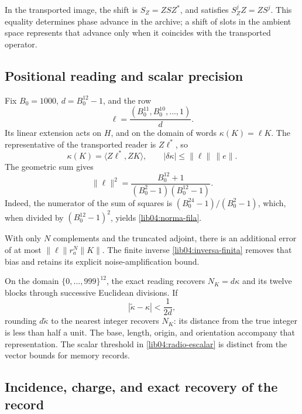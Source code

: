 In the transported image, the shift is
\(S_Z=ZSZ^*\), and satisfies \(S_Z^jZ=ZS^j\). This equality
determines phase advance in the archive; a shift of slots in the
ambient space represents that advance only when it coincides with
the transported operator.

\subsection{Positional reading and scalar precision}
\label{lib04:kappa}

Fix \(B_0=1000\), \(d=B_0^{12}-1\), and the row
\begin{equation}
 \ell=\frac{(B_0^{11},B_0^{10},\ldots,1)}{d}.
 \label{lib04:fila-posicional}
\end{equation}
Its linear extension acts on \(H\), and on the domain of words
\(\kappa(K)=\ell K\). The representative of the transported reader is
\(Z\ell^*\), so
\begin{equation}
 \kappa(K)=\langle Z\ell^*,ZK\rangle,\qquad
 |\delta\kappa|\leq\|\ell\|\,\|e\|.
 \label{lib04:lectura-kappa}
\end{equation}
The geometric sum gives
\begin{equation}
 \|\ell\|^2
 =\frac{B_0^{12}+1}{(B_0^2-1)(B_0^{12}-1)}.
 \label{lib04:norma-fila}
\end{equation}
Indeed, the numerator of the sum of squares is
\((B_0^{24}-1)/(B_0^2-1)\), which, when divided by
\((B_0^{12}-1)^2\), yields \eqref{lib04:norma-fila}.

With only \(N\) complements and the truncated adjoint, there is an
additional error of at most \(\|\ell\|r_a^N\|K\|\). The finite inverse
\eqref{lib04:inversa-finita} removes that bias and retains its explicit
noise-amplification bound.

On the domain \(\{0,\ldots,999\}^{12}\), the exact reading
recovers \(N_K=d\kappa\) and its twelve blocks through successive
Euclidean divisions. If
\begin{equation}
 |\widetilde\kappa-\kappa|<\frac1{2d},
 \label{lib04:radio-escalar}
\end{equation}
rounding \(d\widetilde\kappa\) to the nearest integer
recovers \(N_K\): its distance from the true integer is less than
half a unit. The base, length, origin, and orientation accompany
that representation. The scalar threshold in
\eqref{lib04:radio-escalar} is distinct from the vector bounds
for memory records.

\subsection{Incidence, charge, and exact recovery of the record}
\label{lib04:incidencia}

